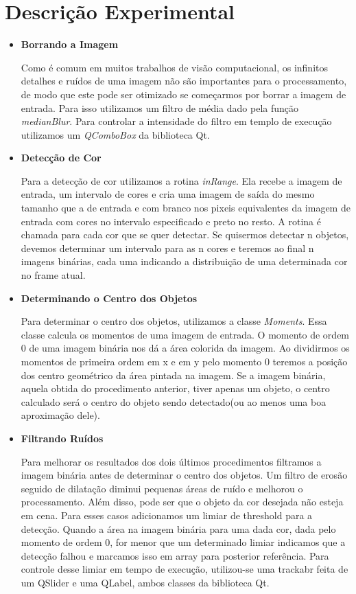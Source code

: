 \documentclass[journal]{IEEEtran}
\begin{document}
\section{Descrição Experimental}
\begin{itemize}
 \item \textbf{Borrando a Imagem}

    Como é comum em muitos trabalhos de visão computacional,
    os infinitos detalhes e ruídos de uma imagem não são importantes
    para o processamento, de modo que este pode ser otimizado se 
    começarmos por borrar a imagem de entrada. Para isso utilizamos
    um filtro de média dado pela função \textit{medianBlur}. Para
    controlar a intensidade do filtro em templo de execução utilizamos
    um \textit{QComboBox} da biblioteca Qt.
  
  \item \textbf{Detecção de Cor}
 
  Para a detecção de cor utilizamos a rotina \textit{inRange}. Ela 
  recebe a imagem de entrada, um intervalo de cores e cria uma imagem 
  de saída do mesmo tamanho que a de entrada e com branco nos pixeis 
equivalentes da imagem de entrada com cores no intervalo especificado 
e preto no resto. A rotina é chamada para cada cor que se quer 
detectar. Se quisermos detectar n objetos, devemos determinar um 
intervalo para as n cores e teremos ao final n imagens binárias,
cada uma indicando a distribuição de uma determinada cor no frame atual.

\item \textbf{Determinando o Centro dos Objetos}

Para determinar o centro dos objetos, utilizamos a classe 
\textit{Moments}. Essa classe calcula os momentos de uma imagem de 
entrada. O momento de ordem 0 de uma imagem binária nos dá a área
colorida da imagem. Ao dividirmos os momentos de primeira ordem em x 
e em y pelo momento 0 teremos a posição dos centro geométrico da área
pintada na imagem. Se a imagem binária, aquela obtida do procedimento 
anterior, tiver apenas um objeto, o centro calculado será o centro do
objeto sendo detectado(ou ao menos uma boa aproximação dele).

\item \textbf{Filtrando Ruídos}

Para melhorar os resultados dos dois últimos procedimentos filtramos 
a imagem binária antes de determinar o centro dos objetos.
Um filtro de erosão seguido de dilatação diminui pequenas áreas
de ruído e melhorou o processamento. Além disso, pode ser que o objeto
da cor desejada não esteja em cena. Para esses casos adicionamos um 
limiar de threshold para a detecção. Quando a área na imagem binária 
para uma dada cor, dada pelo momento de ordem 0, for menor que um 
determinado limiar indicamos que a detecção falhou e marcamos isso em 
array para posterior referência. Para controle desse limiar em tempo 
de execução, utilizou-se uma trackabr feita de um QSlider e uma 
QLabel, ambos classes da biblioteca Qt.



\end{itemize}
\end{document}
